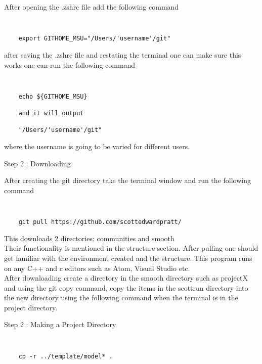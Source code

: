 \documentclass[12pt]{article}
\numberwithin{equation}{section}
\numberwithin{figure}{section}
\begin{document}
After opening the .zshrc file add the following command 

{\tt 
\begin{verbatim}
    export GITHOME_MSU="/Users/'username'/git"
\end{verbatim}
}

after saving the .zshrc file and restating the terminal one can make sure this works one can run the following command 

{\tt 
\begin{verbatim}
    echo ${GITHOME_MSU} 
    
    and it will output 
    
    "/Users/'username'/git"
\end{verbatim}
}

where the username is going to be varied for different users.

\begin{description}
\item[Step 2 : Downloading] 
\end{description}

After creating the git directory take the terminal window and run the following command 

{\tt 
\begin{verbatim}
    git pull https://github.com/scottedwardpratt/ 
\end{verbatim}
}

This downloads 2 directories: communities and smooth \\

Their functionality is mentioned in the structure section. 
After pulling one should get familiar with the environment created and the structure. This program runs on any C++ and c editors such as Atom, Visual Studio etc. \\ 

After downloading create a directory in the smooth directory such as projectX and using the git copy command, copy the items in the scottrun directory into the new directory using the following command when the terminal is in the project directory.



\begin{description}
\item[Step 2 : Making a Project Directory] 
\end{description}
{\tt 
\begin{verbatim}
    cp -r ../template/model* . 
\end{verbatim}
}
     
\end{document}
